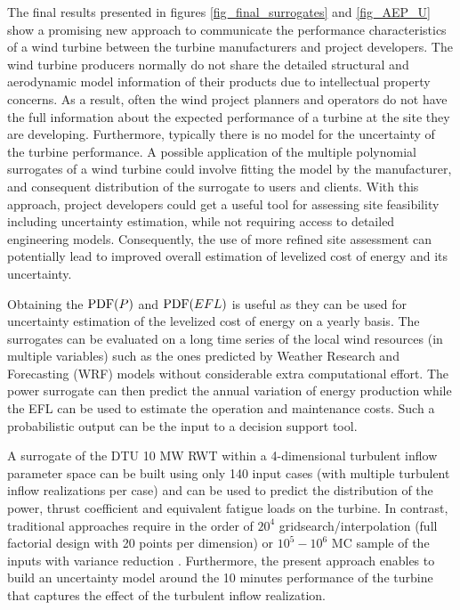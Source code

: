 \documentclass[preprint,12pt]{elsarticle}
\begin{document}
The final results presented in figures \ref{fig_final_surrogates} and \ref{fig_AEP_U} show a promising new approach to communicate the performance characteristics of a wind turbine between the turbine manufacturers and project developers. The wind turbine producers normally do not share the detailed structural and aerodynamic model information of their products due to intellectual property concerns. As a result, often the wind project planners and operators do not have the full information about the expected performance of a turbine at the site they are developing. Furthermore, typically there is no model for the uncertainty of the turbine performance. A possible application of the multiple polynomial surrogates of a wind turbine could involve fitting the model by the manufacturer, and consequent distribution of the surrogate to users and clients. With this approach, project developers could get a useful tool for assessing site feasibility including uncertainty estimation, while not requiring access to detailed engineering models. Consequently, the use of more refined site assessment can potentially lead to improved overall estimation of levelized cost of energy and its uncertainty.

Obtaining the $\mathrm{PDF}(P)$ and $\mathrm{PDF}(EFL)$ is useful as they can be used for uncertainty estimation of the levelized cost of energy on a yearly basis. The surrogates can be evaluated on a long time series of the local wind resources (in multiple variables) such as the ones predicted by Weather Research and Forecasting (WRF) models without considerable extra computational effort. The power surrogate can then predict the annual variation of energy production while the EFL can be used to estimate the operation and maintenance costs. Such a probabilistic output can be the input to a decision support tool.

A surrogate of the DTU 10 MW RWT within a 4-dimensional turbulent inflow parameter space can be built using only 140 input cases (with multiple turbulent inflow realizations per case) and can be used to predict the distribution of the power, thrust coefficient and equivalent fatigue loads on the turbine. In contrast, traditional approaches require in the order of $20^4$ gridsearch/interpolation (full factorial design with  20 points per dimension) or $10^5-10^6$ MC sample of the inputs with variance reduction \cite{dimitrov2015model}. Furthermore, the present approach enables to build an uncertainty model around the 10 minutes performance of the turbine that captures the effect of the turbulent inflow realization.
\end{document}
